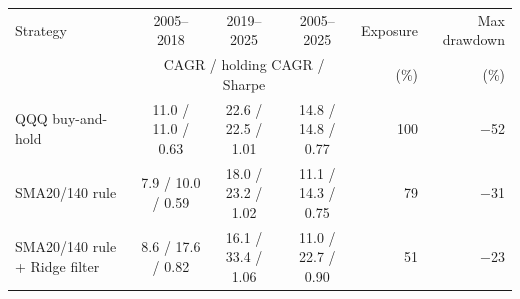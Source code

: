 \begin{tabular}{lcccrr}
\toprule
Strategy & 2005--2018 & 2019--2025 & 2005--2025 & Exposure & Max drawdown \\
 & \multicolumn{3}{c}{\footnotesize CAGR / holding CAGR / Sharpe} & (\%) & (\%) \\
\midrule
QQQ buy-and-hold & 11.0 / 11.0 / 0.63 & 22.6 / 22.5 / 1.01 & 14.8 / 14.8 / 0.77 & 100 & $-$52 \\
SMA20/140 rule & 7.9 / 10.0 / 0.59 & 18.0 / 23.2 / 1.02 & 11.1 / 14.3 / 0.75 & 79 & $-$31 \\
SMA20/140 rule + Ridge filter & 8.6 / 17.6 / 0.82 & 16.1 / 33.4 / 1.06 & 11.0 / 22.7 / 0.90 & 51 & $-$23 \\
\bottomrule
\end{tabular}
